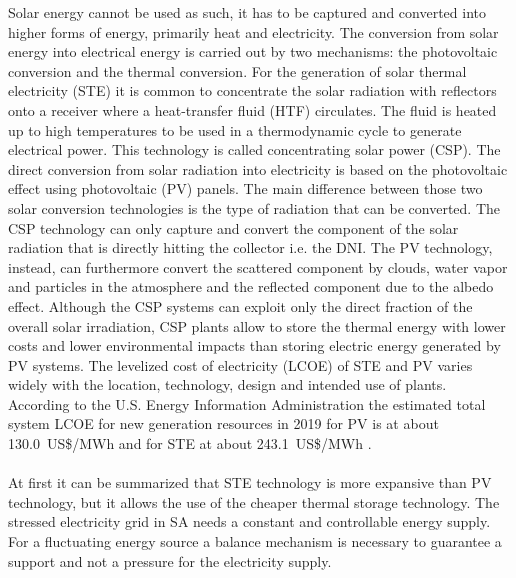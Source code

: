 \documentclass[Master,MEE,english]{twbook}%
\begin{document}
Solar energy cannot be used as such, it has to be captured and converted into higher forms of energy, primarily heat and electricity. The conversion from solar energy into electrical energy is carried out by two mechanisms: the photovoltaic conversion and the thermal conversion. For the generation of solar thermal electricity (STE) it is common to concentrate the solar radiation with reflectors onto a receiver where a heat-transfer fluid (HTF) circulates. The fluid is heated up to high temperatures to be used in a thermodynamic cycle to generate electrical power. This technology is called concentrating solar power (CSP). The direct conversion from solar radiation into electricity is based on the photovoltaic effect using photovoltaic (PV) panels. The main difference between those two solar conversion technologies is the type of radiation that can be converted. The CSP technology can only capture and convert the  component of the solar radiation that is directly hitting the collector i.e. the DNI. The PV technology, instead, can furthermore convert the scattered component by clouds, water vapor and particles in the atmosphere and the reflected component due to the albedo effect. Although the CSP systems can exploit only the direct fraction of the overall solar irradiation, CSP plants allow to store the thermal energy with lower costs and lower environmental impacts than storing electric energy generated by PV systems. \cite{IEA2014e,EASAC2011} The levelized cost of electricity (LCOE) of STE and PV varies widely with the location, technology, design and intended use of plants. According to the U.S. Energy Information Administration the estimated total system LCOE for new generation resources in 2019 for PV is at about 130.0~US\$/MWh and for STE at about 243.1~US\$/MWh \cite{Outlook2014}. \\
\\
At first it can be summarized that STE technology is more expansive than PV technology, but it allows the use of the cheaper thermal storage technology. The stressed electricity grid in SA needs a constant and controllable energy supply. For a fluctuating energy source a balance mechanism is necessary to guarantee a support and not a pressure for the electricity supply. 

\end{document}
